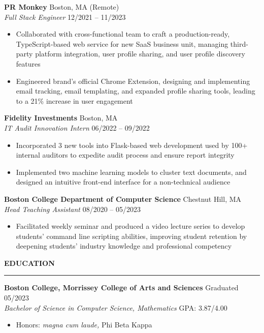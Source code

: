 \documentclass[10pt]{article}
\newcommand{\heading}[1]{{\Large \bfseries \color{primary} #1}}
\begin{document}
{\bfseries PR Monkey} \hfill Boston, MA (Remote) \\
{\itshape Full Stack Engineer} \hfill 12/2021 -- 11/2023
\begin{itemize}
    \item Collaborated with cross-functional team to craft a production-ready, TypeScript-based web service for new SaaS business unit, managing third-party platform integration, user profile sharing, and user profile discovery features
    \item Engineered brand’s official Chrome Extension, designing and implementing email tracking, email templating, and expanded profile sharing tools, leading to a 21\% increase in user engagement
\end{itemize}

\vspace{6pt}

{\bfseries Fidelity Investments} \hfill Boston, MA \\
{\itshape IT Audit Innovation Intern} \hfill 06/2022 -- 09/2022
\begin{itemize}
    \item Incorporated 3 new tools into Flask-based web development used by 100+ internal auditors to expedite audit process and ensure report integrity
    \item Implemented two machine learning models to cluster text documents, and designed an intuitive front-end interface for a non-technical audience
\end{itemize}

\vspace{6pt}

{\bfseries Boston College Department of Computer Science} \hfill Chestnut Hill, MA \\
{\itshape Head Teaching Assistant} \hfill 08/2020 -- 05/2023
\begin{itemize}
    \item Facilitated weekly seminar and produced a video lecture series to develop students’ command line scripting abilities, improving student retention by deepening students' industry knowledge and professional competency
\end{itemize}

\vspace{12pt}

\heading{EDUCATION}
\vspace{4pt}
\hrule
\vspace{6pt}

{\bfseries Boston College, Morrissey College of Arts and Sciences} \hfill Graduated 05/2023 \\
{\itshape Bachelor of Science in Computer Science, Mathematics} \hfill GPA: 3.87/4.00
\begin{itemize}
    \item Honors: \textit{magna cum laude,} Phi Beta Kappa
\end{itemize}
\end{document}
